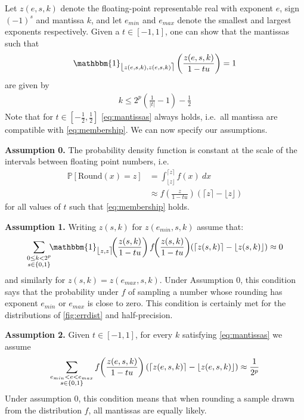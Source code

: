 \documentclass[10pt,conference]{IEEEtran}
\newcommand{\ie}{i.e.\ }
\newcommand{\Pro}[1]{\mathbb{P}\left[ #1 \right]}
\newcommand{\round}{\mathrm{Round}}
\newcommand{\ceil}[1]{\lceil #1 \rceil}
\newcommand{\floor}[1]{\lfloor #1 \rfloor}
\newcommand{\fintvl}[1][x]{\mathlarger{\lfloor}#1,#1\mathlarger{\rceil}}
\newcommand{\one}{\mathbbm{1}}
\newcommand{\absv}[1]{\vert #1\vert}
\begin{document}
Let $z(e,s,k)$ denote the floating-point representable real with exponent $e$, sign $(-1)^s$ and mantissa $k$, and let $e_{min}$ and $e_{max}$ denote the smallest and largest exponents respectively. Given a $t\in \left[-1,1\right]$, one can show that the mantissas such that
\begin{align}
\one_{\fintvl[z(e,s,k)]}\left(\frac{z(e,s,k)}{1-tu}\right)=1\label{eq:membership}
\end{align}
are given by 
\begin{align}
k\leq 2^p\left(\frac{1}{\absv{t}}-1\right)-\frac{1}{2}\label{eq:mantissas}
\end{align}
Note that for $t\in \left[-\frac{1}{2},\frac{1}{2}\right]$ \cref{eq:mantissas} always holds, \ie all mantissa are compatible with \cref{eq:membership}.
We can now specify our assumptions.

\noindent \textbf{Assumption 0.} The probability density function is constant at the scale of the intervals between floating point numbers, \ie
\begin{align*}
\Pro{\round(x)=z}
&=\int_{\floor{z}}^{\ceil{z}} f(x)~dx 
\\
&\approx f\left(\frac{z}{1-tu}\right)(\ceil{z}-\floor{z})
\end{align*}
for all values of $t$ such that \cref{eq:membership} holds.

\noindent  \textbf{Assumption 1.} Writing $z(s,k)$ for $z(e_{min},s,k)$ assume that:
\[
\sum_{\substack{0\leq k<2^p\\ s\in\{0,1\}}}\hspace{-4pt}\one_{\fintvl[z]}\hspace{-4pt}\left(\frac{z(s,k)}{1-tu}\right)f\hspace{-3pt}\left(\frac{z(s,k)}{1-tu}\right)\hspace{-2pt}(\ceil{z(s,k)}-\floor{z(s,k)})\approx 0
\]
and similarly for $z(s,k)=z(e_{max},s,k)$.
Under Assumption 0, this condition says that the probability under $f$ of sampling a number whose rounding has exponent $e_{min}$ or $e_{max}$ is close to zero. This condition is certainly met for the distributions of \cref{fig:errdist} and half-precision.

\noindent \textbf{Assumption 2.} Given $t\in\left[-1,1\right]$, for every $k$ satisfying \cref{eq:mantissas} we assume
\[
\sum_{\substack{e_{min}<e<e_{max}\\ s\in\{0,1\}}}f\hspace{-2pt}\left(\frac{z(e,s,k)}{1-tu}\right)(\ceil{z(e,s,k)}-\floor{z(e,s,k)})\approx \frac{1}{2^p}
\]
Under assumption 0, this condition means that when rounding a sample drawn from the distribution $f$, all mantissas are equally likely.
\end{document}
